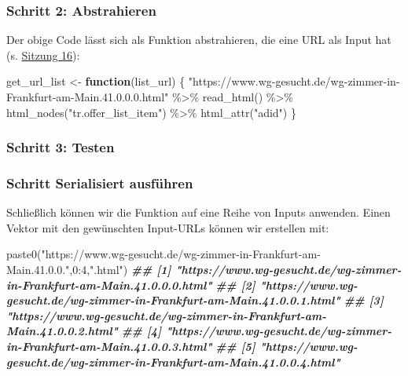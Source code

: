 \documentclass[
  ngerman,
]{article}
\newenvironment{Shaded}{\begin{snugshade}}{\end{snugshade}}
\newcommand{\ControlFlowTok}[1]{\textcolor[rgb]{0.13,0.29,0.53}{\textbf{#1}}}
\newcommand{\DecValTok}[1]{\textcolor[rgb]{0.00,0.00,0.81}{#1}}
\newcommand{\DocumentationTok}[1]{\textcolor[rgb]{0.56,0.35,0.01}{\textbf{\textit{#1}}}}
\newcommand{\FunctionTok}[1]{\textcolor[rgb]{0.00,0.00,0.00}{#1}}
\newcommand{\NormalTok}[1]{#1}
\newcommand{\OtherTok}[1]{\textcolor[rgb]{0.56,0.35,0.01}{#1}}
\newcommand{\SpecialCharTok}[1]{\textcolor[rgb]{0.00,0.00,0.00}{#1}}
\newcommand{\StringTok}[1]{\textcolor[rgb]{0.31,0.60,0.02}{#1}}
\begin{document}
\hypertarget{schritt-2-abstrahieren}{%
\subsubsection{Schritt 2: Abstrahieren}\label{schritt-2-abstrahieren}}

Der obige Code lässt sich als Funktion abstrahieren, die eine URL als Input hat (s. \href{../16_breuer_2005_apis}{Sitzung 16}):

\begin{Shaded}
\begin{Highlighting}[]
\NormalTok{get\_url\_list }\OtherTok{\textless{}{-}} \ControlFlowTok{function}\NormalTok{(list\_url) \{}
  \StringTok{"https://www.wg{-}gesucht.de/wg{-}zimmer{-}in{-}Frankfurt{-}am{-}Main.41.0.0.0.html"} \SpecialCharTok{\%\textgreater{}\%}
    \FunctionTok{read\_html}\NormalTok{() }\SpecialCharTok{\%\textgreater{}\%}
    \FunctionTok{html\_nodes}\NormalTok{(}\StringTok{"tr.offer\_list\_item"}\NormalTok{) }\SpecialCharTok{\%\textgreater{}\%}
    \FunctionTok{html\_attr}\NormalTok{(}\StringTok{"adid"}\NormalTok{)}
\NormalTok{\}}
\end{Highlighting}
\end{Shaded}

\hypertarget{schritt-3-testen}{%
\subsubsection{Schritt 3: Testen}\label{schritt-3-testen}}

\hypertarget{schritt-serialisiert-ausfuxfchren}{%
\subsubsection{Schritt Serialisiert ausführen}\label{schritt-serialisiert-ausfuxfchren}}

Schließlich können wir die Funktion auf eine Reihe von Inputs anwenden. Einen Vektor mit den gewünschten Input-URLs können wir erstellen mit:

\begin{Shaded}
\begin{Highlighting}[]
\FunctionTok{paste0}\NormalTok{(}\StringTok{"https://www.wg{-}gesucht.de/wg{-}zimmer{-}in{-}Frankfurt{-}am{-}Main.41.0.0."}\NormalTok{,}\DecValTok{0}\SpecialCharTok{:}\DecValTok{4}\NormalTok{,}\StringTok{".html"}\NormalTok{)}
\DocumentationTok{\#\# [1] "https://www.wg{-}gesucht.de/wg{-}zimmer{-}in{-}Frankfurt{-}am{-}Main.41.0.0.0.html"}
\DocumentationTok{\#\# [2] "https://www.wg{-}gesucht.de/wg{-}zimmer{-}in{-}Frankfurt{-}am{-}Main.41.0.0.1.html"}
\DocumentationTok{\#\# [3] "https://www.wg{-}gesucht.de/wg{-}zimmer{-}in{-}Frankfurt{-}am{-}Main.41.0.0.2.html"}
\DocumentationTok{\#\# [4] "https://www.wg{-}gesucht.de/wg{-}zimmer{-}in{-}Frankfurt{-}am{-}Main.41.0.0.3.html"}
\DocumentationTok{\#\# [5] "https://www.wg{-}gesucht.de/wg{-}zimmer{-}in{-}Frankfurt{-}am{-}Main.41.0.0.4.html"}
\end{Highlighting}
\end{Shaded}
\end{document}
